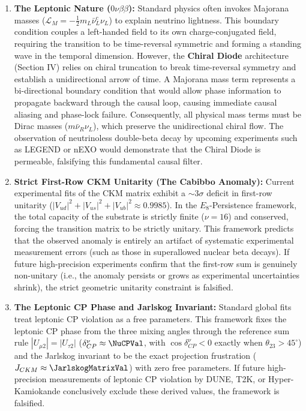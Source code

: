 \begin{enumerate}
    \item \textbf{The Leptonic Nature ($0\nu\beta\beta$):} Standard physics often invokes Majorana masses ($\mathcal{L}_{M} = -\frac{1}{2}m_L \bar{\nu}_L^c \nu_L$) to explain neutrino lightness. This boundary condition couples a left-handed field to its own charge-conjugated field, requiring the transition to be time-reversal symmetric and forming a standing wave in the temporal dimension. However, the \textbf{Chiral Diode} architecture (Section IV) relies on chiral truncation to break time-reversal symmetry and establish a unidirectional arrow of time. A Majorana mass term represents a bi-directional boundary condition that would allow phase information to propagate backward through the causal loop, causing immediate causal aliasing and phase-lock failure. Consequently, all physical mass terms must be Dirac masses ($m \bar{\nu}_R \nu_L$), which preserve the unidirectional chiral flow. The observation of neutrinoless double-beta decay by upcoming experiments such as LEGEND or nEXO would demonstrate that the Chiral Diode is permeable, falsifying this fundamental causal filter.
    
    \item \textbf{Strict First-Row CKM Unitarity (The Cabibbo Anomaly):} Current experimental fits of the CKM matrix exhibit a $\sim 3\sigma$ deficit in first-row unitarity ($|V_{ud}|^2 + |V_{us}|^2 + |V_{ub}|^2 \approx 0.9985$). In the $E_8$-Persistence framework, the total capacity of the substrate is strictly finite ($\nu=16$) and conserved, forcing the transition matrix to be strictly unitary. This framework predicts that the observed anomaly is entirely an artifact of systematic experimental measurement errors (such as those in superallowed nuclear beta decays). If future high-precision experiments confirm that the first-row sum is genuinely non-unitary (i.e., the anomaly persists or grows as experimental uncertainties shrink), the strict geometric unitarity constraint is falsified.
    
    \item \textbf{The Leptonic CP Phase and Jarlskog Invariant:} Standard global fits treat leptonic CP violation as a free parameters. This framework fixes the leptonic CP phase from the three mixing angles through the reference sum rule $|U_{\mu 2}| = |U_{\tau 2}|$ ($\delta_{CP}^\nu \approx \mathbf{\NuCPVal}$, with $\cos\delta_{CP}^\nu < 0$ exactly when $\theta_{23} > 45^\circ$) and the Jarlskog invariant to be the exact projection frustration ($J_{CKM} \approx \mathbf{\JarlskogMatrixVal}$) with zero free parameters. If future high-precision measurements of leptonic CP violation by DUNE, T2K, or Hyper-Kamiokande conclusively exclude these derived values, the framework is falsified.
    

\end{enumerate}
